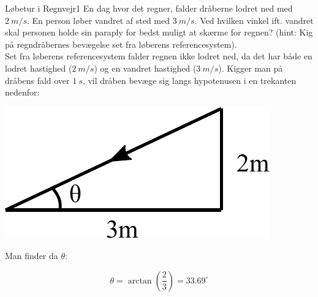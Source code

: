 \documentclass[crop=false, class=memoir]{standalone}
\begin{document}
\begin{opgave}{Løbetur i Regnvejr}{1}
	En dag hvor det regner, falder dråberne lodret ned med $\SI{2}{m/s}$. En person løber vandret af sted med $\SI{3}{m/s}$. Ved hvilken vinkel ift. vandret skal personen holde sin paraply for bedst muligt at skærme for regnen? (hint: Kig på regndråbernes bevægelse set fra løberens referencesystem).\\
	
	Set fra løberens referencesystem falder regnen ikke lodret ned, da det har både en lodret hastighed ($\SI{2}{m/s}$) og en vandret hastighed ($\SI{3}{m/s}$). Kigger man på dråbens fald over $\SI{1}{s}$, vil dråben bevæge sig langs hypotenusen i en trekanten nedenfor:
	\begin{center}
	\includegraphics[scale=0.9]{Rel/regn_fig.pdf}	
	\end{center}
	
	Man finder da $\theta$:
	
	$$\theta = \arctan \left( \frac{2}{3} \right) = 33.69^\circ$$	
\end{opgave}
\end{document}
